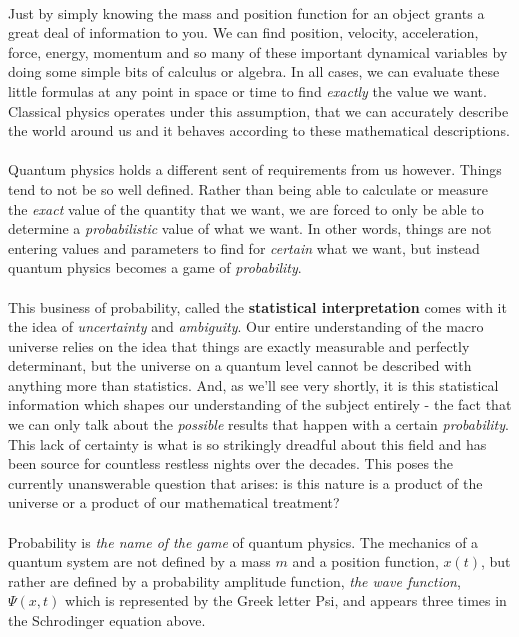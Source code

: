 \documentclass[12pt,letterpaper]{book}
\begin{document}
\paragraph*{}Just by simply knowing the mass and position function for an object grants a great deal of information to you. We can find position, velocity, acceleration, force, energy, momentum and so many of these important dynamical variables by doing some simple bits of calculus or algebra. In all cases, we can evaluate these little formulas at any point in space or time to find \textit{exactly} the value we want. Classical physics operates under this assumption, that we can accurately describe the world around us and it behaves according to these mathematical descriptions.
\paragraph*{}Quantum physics holds a different sent of requirements from us however. Things tend to not be so well defined. Rather than being able to calculate or measure the \textit{exact} value of the quantity that we want, we are forced to only be able to determine a \textit{probabilistic} value of what we want. In other words, things are not entering values and parameters to find for \textit{certain} what we want, but instead quantum physics becomes a game of \textit{probability}.
\paragraph*{}This business of probability, called the \textbf{statistical interpretation} comes with it the idea of \textit{uncertainty} and \textit{ambiguity}. Our entire understanding of the macro universe relies on the idea that things are exactly measurable and perfectly determinant, but the universe on a quantum level cannot be described with anything more than statistics. And, as we'll see very shortly, it is this statistical information which shapes our understanding of the subject entirely - the fact that we can only talk about the \textit{possible} results that happen with a certain \textit{probability}. This lack of certainty is what is so strikingly dreadful about this field and has been source for countless restless nights over the decades. This poses the currently unanswerable question that arises: is this nature is a product of the universe or a product of our mathematical treatment? 
\paragraph*{}Probability is \textit{the name of the game} of quantum physics. The mechanics of a quantum system are not defined by a mass $m$ and a position function, $x(t)$, but rather are defined by a probability amplitude function, \textit{the wave function}, $\Psi(x,t)$ which is represented by the Greek letter Psi, and appears three times in the Schrodinger equation above.
\end{document}
